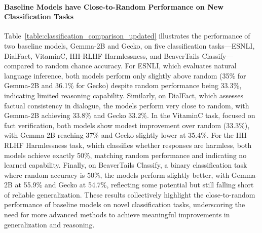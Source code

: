 \paragraph{Baseline Models have Close-to-Random Performance on New Classification Tasks}
\begin{table}[t!]
\vspace{-1em}
\centering
{}
\caption{Results of classification tasks for evaluating factuality and safety. }
\label{table:classification_comparison_updated}
\vspace{-1em}
\end{table}

Table~\ref{table:classification_comparison_updated} illustrates the performance of two baseline models, Gemma-2B and Gecko, on five classification tasks—ESNLI, DialFact, VitaminC, HH-RLHF Harmlessness, and BeaverTails Classify—compared to random chance accuracy. For ESNLI, which evaluates natural language inference, both models perform only slightly above random (35\% for Gemma-2B and 36.1\% for Gecko) despite random performance being 33.3\%, indicating limited reasoning capability. Similarly, on DialFact, which assesses factual consistency in dialogue, the models perform very close to random, with Gemma-2B achieving 33.8\% and Gecko 33.2\%. In the VitaminC task, focused on fact verification, both models show modest improvement over random (33.3\%), with Gemma-2B reaching 37\% and Gecko slightly lower at 35.4\%. For the HH-RLHF Harmlessness task, which classifies whether responses are harmless, both models achieve exactly 50\%, matching random performance and indicating no learned capability. Finally, on BeaverTails Classify, a binary classification task where random accuracy is 50\%, the models perform slightly better, with Gemma-2B at 55.9\% and Gecko at 54.7\%, reflecting some potential but still falling short of reliable generalization. These results collectively highlight the close-to-random performance of baseline models on novel classification tasks, underscoring the need for more advanced methods to achieve meaningful improvements in generalization and reasoning.

